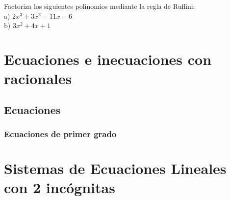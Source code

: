 \begin{ejer}
Factoriza los siguientes polinomios mediante la regla de Ruffini:\\
a) $2x^3+3x^2-11x-6$ \\
b) $3x^2+4x+1$
\end{ejer}

\section{Ecuaciones e inecuaciones con racionales}

\subsection{Ecuaciones}

\subsubsection{Ecuaciones de primer grado}

\begin{ejer}

\end{ejer}

\begin{ejer}

\end{ejer}

\begin{ejer}

\end{ejer}

\begin{ejer}

\end{ejer}

\begin{ejer}

\end{ejer}

\begin{ejer}

\end{ejer}

\section{Sistemas de Ecuaciones Lineales con 2 incógnitas}





